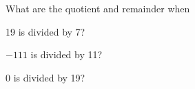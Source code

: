 
%
%
%

	What are the quotient and remainder when
	\begin{subproblem}
		\item 19 is divided by 7?
		\item $-111$ is divided by 11?
		\skipitem
		\skipitem
		\item 0 is divided by 19?
	\end{subproblem}

\solution
